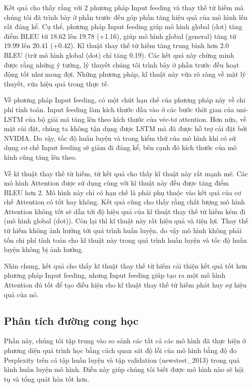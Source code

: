 Kết quả cho thấy rằng với 2 phương pháp Input feeding và thay thế từ hiếm mà chúng tôi đã trình bày ở phần trước đều góp phần tăng hiệu quả của mô hình lên rất đáng kể. Cụ thể, phương pháp Input feeding giúp mô hình global (dot) tăng điểm BLEU từ 18.62 lên 19.78 (+1.16), giúp mô hình global (general) tăng từ 19.99 lên 20.41 (+0.42). Kĩ thuật thay thế từ hiếm tăng trung bình hơn 2.0 BLEU (trừ mô hình global (dot) chỉ tăng 0.19). Các kết quả này chứng minh được rằng những ý tưởng, lý thuyết chúng tôi trình bày ở phần trước đều hoạt động tốt như mong đợi. Những phương pháp, kĩ thuật này vừa rõ ràng về mặt lý thuyết, vừa hiệu quả trong thực tế.

Về phương pháp Input feeding, có một chút hạn chế của phương pháp này về chi phí tính toán. Input feeding làm kích thước đầu vào ở các bước thời gian của uni-LSTM của bộ giải mã tăng lên theo kích thước của véc-tơ attention. Hơn nữa, về mặt cài đặt, chúng ta không tận dụng được LSTM mà đã được hỗ trợ cài đặt bởi NVIDIA. Do vậy, tốc độ huấn luyện và trong kiểm thử của mô hình khi có sử dụng cơ chế Input feeding sẽ giảm đi đáng kể, bên cạnh đó kích thước của mô hình cũng tăng lên theo.

Về kĩ thuật thay thế từ hiếm, từ kết quả cho thấy kĩ thuật này rất mạnh mẽ. Các mô hình Attention được sử dụng cùng với kĩ thuật này đều được tăng điểm BLEU hơn 2. Mô hình này chỉ có hạn chế là phải phụ thuộc vào kết quả của cơ chế Attention có tốt hay không. Kết quả cũng cho thấy rằng chất lượng mô hình Attention không tốt sẽ dẫn tới độ hiệu quả của kĩ thuật thay thế từ hiếm kém đi (mô hình global (dot)). Còn lại thì kĩ thuật này rất hiệu quả và tiện lợi. Thay thế từ hiếm không ảnh hưởng tới quá trình huấn luyện, do vậy mô hình không phải tốn chi phí tính toán cho kĩ thuật này trong quá trình huấn luyện và tốc độ huấn luyện không bị ảnh hưởng. 

Nhìn chung, kết quả cho thấy kĩ thuật thay thế từ hiếm cải thiện kết quả tốt hơn phương pháp Input feeding, nhưng Input feeding giúp tạo ra một mô hình Attention đủ tốt để tạo điều kiện cho kĩ thuật thay thế từ hiếm phát huy sự hiệu quả của nó.

\subsection{Phân tích đường cong học}
Phần này, chúng tôi tập trung vào so sánh các tất cả các mô hình đã thực hiện ở phương diện quá trình học bằng cách quan sát độ lỗi của mô hình bằng độ đo Perplexity trên cả tập huấn luyện và tập validation (newstest\_2013) trong quá hình huấn luyện mô hình. Điều này giúp chúng tôi biết được mô hình nào sẽ hội tụ và tổng quát hóa tốt hơn.

